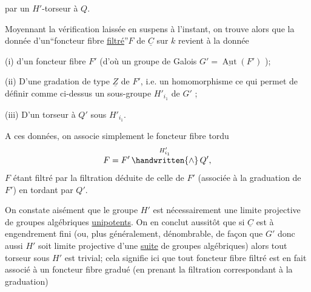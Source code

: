 par un $H'$-torseur à  $Q$.

Moyennant la vérification laissée en suspens à l'instant, on trouve alors que la donnée d'un``foncteur fibre \uline{filtré}''$F$ de $\underline{C}$ sur $k$ revient à la donnée

(i) d'un foncteur fibre $F'$  (d'où un groupe de Galois $G'=\underline{\operatorname{Aut}}(F')$ );

(ii) D'une gradation de type $\underline{Z}$ de $F'$, i.e. un homomorphisme
ce qui permet de définir comme ci-dessus un sous-groupe $H'_{i_1}$ de $G'$ ;

(iii) D'un torseur à  $Q'$ sous $H'_{i_1}$.

A ces données, on associe simplement le foncteur fibre tordu
\[
F=F'\mathop{\handwritten{\wedge}}\limits^{H'_{i_1}}Q',
\]
$F$ étant filtré par la filtration déduite de celle de $F'$  (associée à la graduation de $F'$) en tordant par $Q'$.


On constate aisément que le groupe $H'$ est nécessairement une limite projective de groupes algébriques \uline{unipotents}. On en conclut aussitôt que si $\underline{C}$ est à engendrement fini (ou, plus généralement,  dénombrable, de façon que $G'$  donc aussi $H'$ soit limite projective d'une \uline{suite} de groupes algébriques) alors tout torseur sous $H'$ est trivial; cela signifie ici que tout foncteur fibre filtré est en fait associé à un foncteur fibre gradué (en prenant la filtration correspondant à la graduation)

